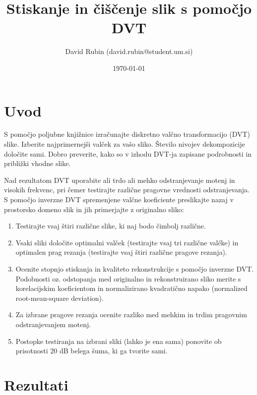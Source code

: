 \documentclass[a4paper,11pt]{article}
\title{Stiskanje in čiščenje slik s pomočjo DVT}
\author{David Rubin (david.rubin@student.um.si)}
\date{\today}
\begin{document}
\maketitle

\section{Uvod}

S pomočjo poljubne knjižnice izračunajte diskretno valčno transformacijo (DVT) slike. Izberite najprimernejši valček za vašo sliko. Število nivojev dekompozicije določite sami. Dobro preverite, kako so v izhodu DVT-ja zapisane podrobnosti in približki vhodne slike. 

Nad rezultatom DVT uporabite ali trdo ali mehko odstranjevanje motenj in visokih frekvenc, pri čemer testirajte različne pragovne vrednosti odstranjevanja. S pomočjo inverzne DVT spremenjene valčne koeficiente preslikajte nazaj v prostorsko domeno slik in jih primerjajte z originalno  sliko:
\begin{enumerate}
\item Testirajte vsaj štiri različne slike, ki naj bodo čimbolj različne. 
\item Vsaki sliki določite optimalni valček (testirajte vsaj tri različne valčke) in optimalen prag rezanja (testirajte vsaj štiri različne pragove rezanja). 
\item Ocenite stopnjo stiskanja in kvaliteto rekonstrukcije s pomočjo inverzne  DVT. Podobnosti oz. odstopanja med originalno in rekonstruirano sliko merite s korelacijskim koeficientom in normalizirano kvadratično napako (normalized root-mean-square deviation).
\item Za izbrane pragove rezanja ocenite razliko med mehkim in trdim pragovnim odstranjevanjem motenj. 
\item Postopke testiranja na izbrani sliki (lahko je ena sama) ponovite ob prisotnosti 20 dB belega šuma, ki ga tvorite sami.
\end{enumerate}

\section{Rezultati}

\end{document}
